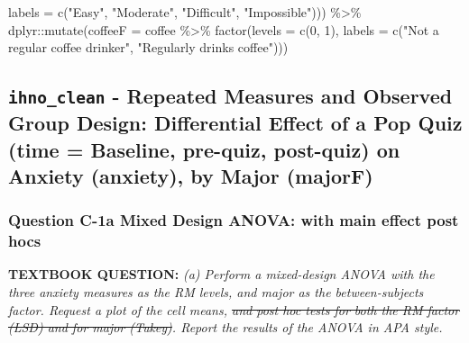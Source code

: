 \documentclass[
]{article}
\newenvironment{Shaded}{\begin{snugshade}}{\end{snugshade}}
\newcommand{\AttributeTok}[1]{\textcolor[rgb]{0.77,0.63,0.00}{#1}}
\newcommand{\DecValTok}[1]{\textcolor[rgb]{0.00,0.00,0.81}{#1}}
\newcommand{\FunctionTok}[1]{\textcolor[rgb]{0.00,0.00,0.00}{#1}}
\newcommand{\NormalTok}[1]{#1}
\newcommand{\SpecialCharTok}[1]{\textcolor[rgb]{0.00,0.00,0.00}{#1}}
\newcommand{\StringTok}[1]{\textcolor[rgb]{0.31,0.60,0.02}{#1}}
\begin{document}
\begin{Shaded}
\begin{Highlighting}[]
                         \AttributeTok{labels =} \FunctionTok{c}\NormalTok{(}\StringTok{"Easy"}\NormalTok{,}
                                    \StringTok{"Moderate"}\NormalTok{,}
                                    \StringTok{"Difficult"}\NormalTok{,}
                                    \StringTok{"Impossible"}\NormalTok{))) }\SpecialCharTok{\%\textgreater{}\%} 
\NormalTok{  dplyr}\SpecialCharTok{::}\FunctionTok{mutate}\NormalTok{(}\AttributeTok{coffeeF =}\NormalTok{ coffee }\SpecialCharTok{\%\textgreater{}\%} 
                  \FunctionTok{factor}\NormalTok{(}\AttributeTok{levels =} \FunctionTok{c}\NormalTok{(}\DecValTok{0}\NormalTok{, }\DecValTok{1}\NormalTok{),}
                         \AttributeTok{labels =} \FunctionTok{c}\NormalTok{(}\StringTok{"Not a regular coffee drinker"}\NormalTok{,}
                                    \StringTok{"Regularly drinks coffee"}\NormalTok{)))}
\end{Highlighting}
\end{Shaded}

\clearpage

\hypertarget{ihno_clean---repeated-measures-and-observed-group-design-differential-effect-of-a-pop-quiz-time-baseline-pre-quiz-post-quiz-on-anxiety-anxiety-by-major-majorf}{%
\subsection{\texorpdfstring{\texttt{ihno\_clean} - Repeated Measures and
Observed Group Design: Differential Effect of a Pop Quiz (time =
Baseline, pre-quiz, post-quiz) on Anxiety (anxiety), by Major
(majorF)}{ihno\_clean - Repeated Measures and Observed Group Design: Differential Effect of a Pop Quiz (time = Baseline, pre-quiz, post-quiz) on Anxiety (anxiety), by Major (majorF)}}\label{ihno_clean---repeated-measures-and-observed-group-design-differential-effect-of-a-pop-quiz-time-baseline-pre-quiz-post-quiz-on-anxiety-anxiety-by-major-majorf}}

\hypertarget{question-c-1a-mixed-design-anova-with-main-effect-post-hocs}{%
\subsubsection{Question C-1a Mixed Design ANOVA: with main effect post
hocs}\label{question-c-1a-mixed-design-anova-with-main-effect-post-hocs}}

\textbf{TEXTBOOK QUESTION:} \emph{(a) Perform a mixed-design ANOVA with
the three anxiety measures as the RM levels, and major as the
between-subjects factor. Request a plot of the cell means, \sout{and
post hoc tests for both the RM factor (LSD) and for major (Tukey)}.
Report the results of the ANOVA in APA style.}
\end{document}
